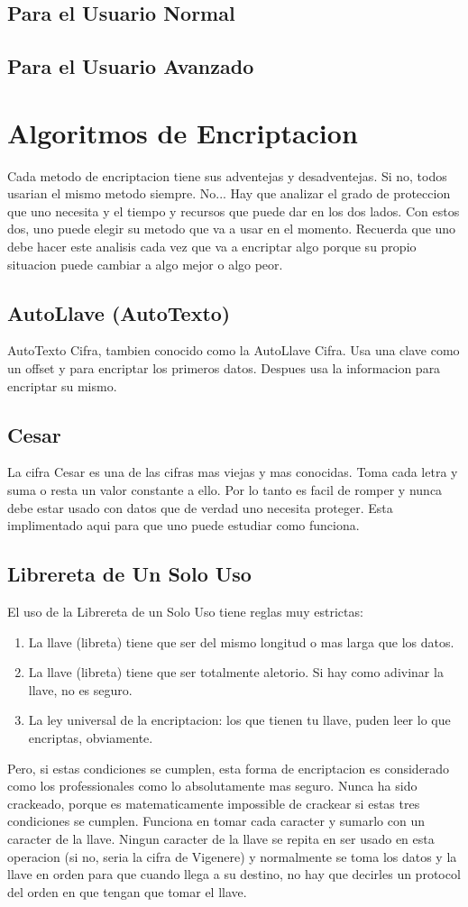 \documentclass{article}
\begin{document}
		\subsection{Para el Usuario Normal}
		\subsection{Para el Usuario Avanzado}
	\section{Algoritmos de Encriptacion}
		Cada metodo de encriptacion tiene sus adventejas y desadventejas. Si no, todos usarian el mismo metodo siempre. No... Hay que analizar el grado de proteccion que uno necesita y el tiempo y recursos que puede dar en los dos lados. Con estos dos, uno puede elegir su metodo que va a usar en el momento. Recuerda que uno debe hacer este analisis cada vez que va a encriptar algo porque su propio situacion puede cambiar a algo mejor o algo peor.
		\subsection{AutoLlave (AutoTexto)}
			AutoTexto Cifra, tambien conocido como la AutoLlave Cifra. Usa una clave como un offset y para encriptar los primeros datos. Despues usa la informacion para encriptar su mismo.
		\subsection{Cesar}
			La cifra Cesar es una de las cifras mas viejas y mas conocidas. Toma cada letra y suma o resta un valor constante a ello. Por lo tanto es facil de romper y nunca debe estar usado con datos que de verdad uno necesita proteger. Esta implimentado aqui para que uno puede estudiar como funciona.
		\subsection{Librereta de Un Solo Uso}
			El uso de la Librereta de un Solo Uso tiene reglas muy estrictas:
			\begin{enumerate}  
				\item La llave (libreta) tiene que ser del mismo longitud o mas larga que los datos.
				\item La llave (libreta) tiene que ser totalmente aletorio. Si hay como adivinar la llave, no es seguro.
				\item La ley universal de la encriptacion: los que tienen tu llave, puden leer lo que encriptas, obviamente.
			\end{enumerate}  
			Pero, si estas condiciones se cumplen, esta forma de encriptacion es considerado como los professionales como lo absolutamente mas seguro. Nunca ha sido crackeado, porque es matematicamente impossible de crackear si estas tres condiciones se cumplen. Funciona en tomar cada caracter y sumarlo con un caracter de la llave. Ningun caracter de la llave se repita en ser usado en esta operacion (si no, seria la cifra de Vigenere) y normalmente se toma los datos y la llave en orden para que cuando llega a su destino, no hay que decirles un protocol del orden en que tengan que tomar el llave.
\end{document}
